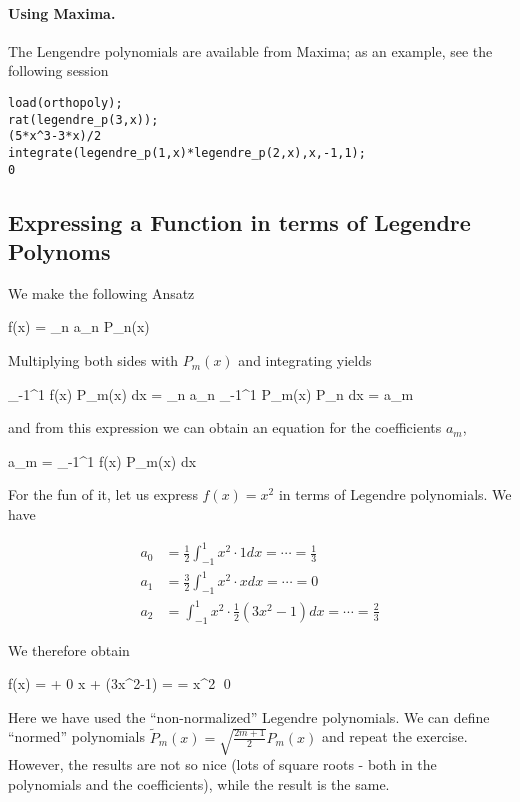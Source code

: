 \paragraph{Using Maxima.} The Lengendre polynomials are available from Maxima; as an example, see the following session

\begin{verbatim}
load(orthopoly);
rat(legendre_p(3,x));
(5*x^3-3*x)/2
integrate(legendre_p(1,x)*legendre_p(2,x),x,-1,1);
0
\end{verbatim}

\subsection{Expressing a Function in terms of Legendre Polynoms}

We make the following Ansatz

\bee
f(x) = \sum_n a_n P_n(x)
\eee

Multiplying both sides with $P_m(x)$ and integrating yields

\bee
\int_{-1}^1 f(x) P_m(x) dx = \sum_n a_n \int_{-1}^1 P_m(x) P_n dx =  a_m
\eee

and from this expression we can obtain an equation for the coefficients $a_m$,

\bee
a_m =  \int_{-1}^1 f(x) P_m(x) dx
\eee

For the fun of it, let us express $f(x)=x^2$ in terms of Legendre polynomials. We have

\begin{align*}
  a_0 &= \frac{1}{2} \int_{-1}^1 x^2 \cdot 1 dx = \cdots = \frac{1}{3}\\
  a_1 &= \frac{3}{2} \int_{-1}^1 x^2 \cdot x dx = \cdots = 0\\
  a_2 &= \int_{-1}^1 x^2 \cdot \frac{1}{2}(3x^2-1) dx = \cdots = \frac{2}{3}
\end{align*}

We therefore obtain

\bee
f(x) =   + 0 \cdot x +  (3x^2-1) = \cdots = x^2 \qed
\eee

Here we have used the ``non-normalized'' Legendre polynomials. We can define ``normed'' polynomials $\tilde{P}_m(x) = \sqrt{\frac{2m+1}{2}} P_m(x)$ and repeat the exercise. However, the results are not so nice (lots of square roots - both in the polynomials and the coefficients), while the result is the same.




